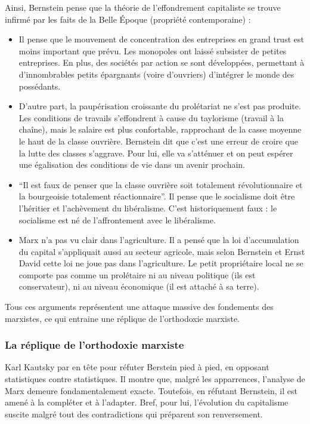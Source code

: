 \documentclass[12pt]{report}
\begin{document}

Ainsi, Bernstein pense que la théorie de l’effondrement capitaliste se trouve infirmé par les faits de la Belle Époque (propriété contemporaine) :
\begin{itemize}
	\item Il pense que le mouvement de concentration des entreprises en grand trust est moins important que prévu. Les monopoles ont laissé subsister de petites entreprises. En plus, des sociétés par action se sont développées, permettant à d’innombrables petits épargnants (voire d’ouvriers) d'intégrer le monde des possédants.
	\item D’autre part, la paupérisation croissante du prolétariat ne s’est pas produite. Les conditions de travails s'effondrent à cause du taylorisme (travail à la chaîne), mais le salaire est plus confortable, rapprochant de la casse moyenne le haut de la classe ouvrière. Bernstein dit que c’est une erreur de croire que la lutte des classes s’aggrave. Pour lui, elle va s'atténuer et on peut espérer une égalisation des conditions de vie dans un avenir prochain.
	\item \enquote{Il est faux de penser que la classe ouvrière soit totalement révolutionnaire et la bourgeoisie totalement réactionnaire}. Il pense que le socialisme doit être l’héritier et l’achèvement du libéralisme. C’est historiquement faux : le socialisme est né de l'affrontement avec le libéralisme.
	\item Marx n’a pas vu clair dans l’agriculture. Il a pensé que la loi d’accumulation du capital s’appliquait aussi au secteur agricole, mais selon Bernstein et Ernst David cette loi ne joue pas dans l’agriculture. Le petit propriétaire local ne se comporte pas comme un prolétaire ni au niveau politique (ils est conservateur), ni au niveau économique (il est attaché à sa terre). 
\end{itemize}

Tous ces arguments représentent une attaque massive des fondements des marxistes, ce qui entraine une réplique de l'orthodoxie marxiste.


\subsubsection{La réplique de l'orthodoxie marxiste}

Karl Kautsky par en tête pour réfuter Berstein pied à pied, en opposant statistiques contre statistiques.
Il montre que, malgré les apparrences, l'analyse de Marx demeure fondamentalement exacte. Toutefois, en réfutant Bernstein, il est amené à la compléter et à l'adapter.
Bref, pour lui, l'évolution du capitalisme suscite malgré tout des contradictions qui préparent son renversement.
\end{document}
